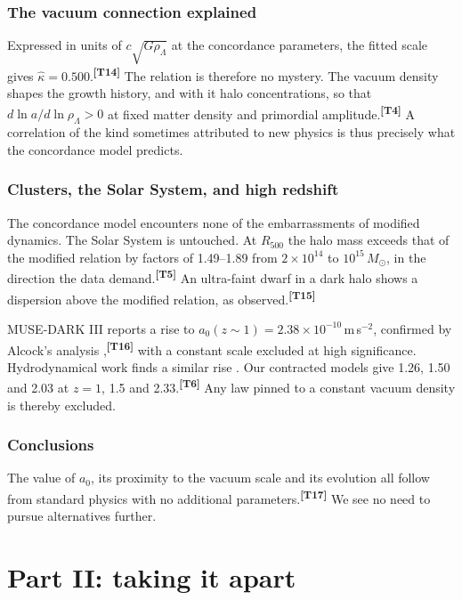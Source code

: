 \documentclass[10pt]{article}
\newcommand{\tell}[1]{\textsuperscript{\color{rt}\bfseries[T#1]}}
\begin{document}
\section{The vacuum connection explained}
Expressed in units of $c\sqrt{G\rho_\Lambda}$ at the concordance parameters, the fitted scale gives $\hat\kappa=0.500$.\tell{14} The relation is therefore no mystery. The vacuum density shapes the growth history, and with it halo concentrations, so that $d\ln a/d\ln\rho_\Lambda>0$ at fixed matter density and primordial amplitude.\tell{4} A correlation of the kind sometimes attributed to new physics is thus precisely what the concordance model predicts.

\section{Clusters, the Solar System, and high redshift}
The concordance model encounters none of the embarrassments of modified dynamics. The Solar System is untouched. At $R_{500}$ the halo mass exceeds that of the modified relation by factors of 1.49--1.89 from $2\times10^{14}$ to $10^{15}\,M_\odot$, in the direction the data demand.\tell{5} An ultra-faint dwarf in a dark halo shows a dispersion above the modified relation, as observed.\tell{15}

MUSE-DARK III \cite{C26} reports a rise to $a_0(z\sim1)=2.38\times10^{-10}$\,m\,s$^{-2}$, confirmed by Alcock's analysis \cite{Al26},\tell{16} with a constant scale excluded at high significance. Hydrodynamical work finds a similar rise \cite{Ma23}. Our contracted models give 1.26, 1.50 and 2.03 at $z=1$, 1.5 and 2.33.\tell{6} Any law pinned to a constant vacuum density is thereby excluded.

\section{Conclusions}
The value of $a_0$, its proximity to the vacuum scale and its evolution all follow from standard physics with no additional parameters.\tell{17} We see no need to pursue alternatives further.

\part*{Part II: taking it apart}
\end{document}
